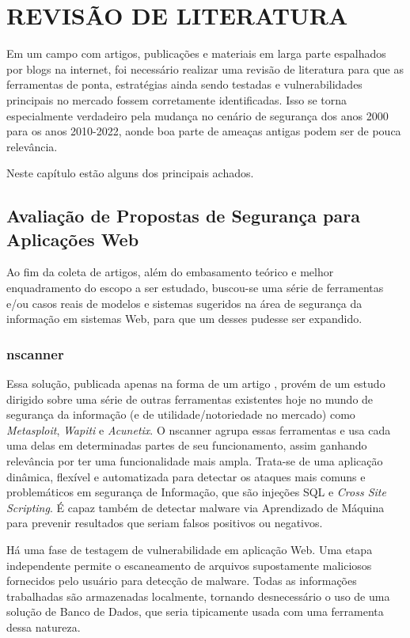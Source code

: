\chapter{REVISÃO DE LITERATURA}
\label{chp:capitulo3}
Em um campo com artigos, publicações e materiais em larga parte espalhados por blogs na internet, foi necessário realizar uma revisão de literatura para que as ferramentas de ponta, estratégias ainda sendo testadas e vulnerabilidades principais no mercado fossem corretamente identificadas. Isso se torna especialmente verdadeiro pela mudança no cenário de segurança dos anos 2000 para os anos 2010-2022, aonde boa parte de ameaças antigas podem ser de pouca relevância.

Neste capítulo estão alguns dos principais achados.

\section{Avaliação de Propostas de Segurança para Aplicações Web}
Ao fim da coleta de artigos, além do embasamento teórico e melhor enquadramento do escopo a ser estudado, buscou-se uma série de ferramentas e/ou casos reais de modelos e sistemas sugeridos na área de segurança da informação em sistemas Web, para que um desses pudesse ser expandido.

\subsection{nscanner}
Essa solução, publicada apenas na forma de um artigo \cite{surian_nscanner_2020}, provém de um estudo dirigido sobre uma série de outras ferramentas existentes hoje no mundo de segurança da informação (e de utilidade/notoriedade no mercado) como \textit{Metasploit}, \textit{Wapiti} e \textit{Acunetix}. O nscanner agrupa essas ferramentas e usa cada uma delas em determinadas partes de seu funcionamento, assim ganhando relevância por ter uma funcionalidade mais ampla.  Trata-se de uma aplicação dinâmica, flexível e automatizada para detectar os ataques mais comuns e problemáticos em segurança de Informação, que são injeções SQL e \textit{Cross Site Scripting}. É capaz também de detectar malware via Aprendizado de Máquina para prevenir resultados que seriam falsos positivos ou negativos.

Há uma fase de testagem de vulnerabilidade em aplicação Web. Uma etapa independente permite o escaneamento de arquivos supostamente maliciosos fornecidos pelo usuário para detecção de malware. Todas as informações trabalhadas são armazenadas localmente, tornando desnecessário o uso de uma solução de Banco de Dados, que seria tipicamente usada com uma ferramenta dessa natureza.

